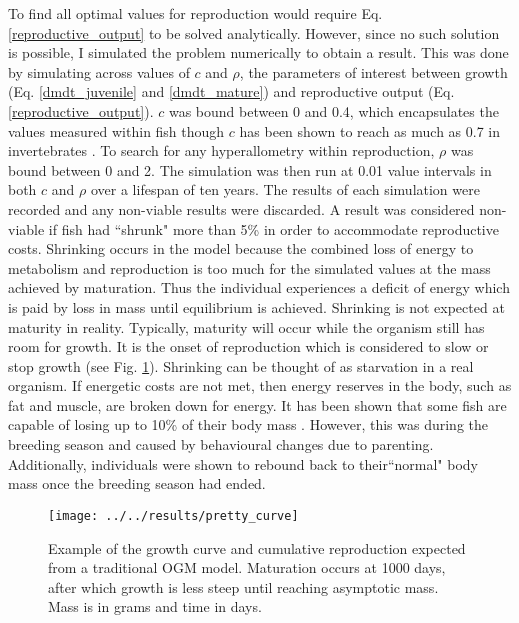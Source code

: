\documentclass[a4paper, 11pt, hidelinks]{article} %
\begin{document}
	To find all optimal values for reproduction would require Eq. \ref{reproductive_output} to be solved analytically.  However, since no such solution is possible, I simulated the problem numerically to obtain a result.  This was done by simulating across values of $ c $ and $ \rho $, the parameters of interest between growth (Eq. \ref{dmdt_juvenile} and \ref{dmdt_mature}) and reproductive output (Eq. \ref{reproductive_output}).  $ c $ was bound between 0 and 0.4, which encapsulates the values measured within fish \parencite{Roff1983, Wootton1985, Lambert2000, Fontoura2009, Benoit2018} though $ c $ has been shown to reach as much as 0.7 in invertebrates \parencite{Parker2018}.  To search for any hyperallometry within reproduction, $ \rho $ was bound between 0 and 2.  
	The simulation was then run at 0.01 value intervals in both $c$ and $\rho$ over a lifespan of ten years.  The results of each simulation were recorded and any non-viable results were discarded.  A result was considered non-viable if fish had ``shrunk" more than 5\% in order to accommodate reproductive costs.  Shrinking occurs in the model because  the combined loss of energy to metabolism and reproduction is too much for the simulated values at the mass achieved by maturation.  Thus the individual experiences a deficit of energy which is paid by loss in mass until equilibrium is achieved. %
	Shrinking is not expected at maturity in reality.  Typically, maturity will occur while the organism still has room for growth.  It is the onset of reproduction which is considered to slow or stop growth %
	(see Fig. \ref{OGM_Curve}).  Shrinking can be thought of as starvation in a real organism.  If energetic costs are not met, then energy reserves in the body, such as fat and muscle, are broken down for energy.  It has been shown that some fish are capable of losing up to 10\% of their body mass \parencite{VandenBerghe1992}.  However, this was during the breeding season and caused by behavioural changes due to parenting.  Additionally, individuals were shown to rebound back to their``normal" body mass once the breeding season had ended. %
	\begin{figure}[H]
		\centering 
		\texttt{[image: ../../results/pretty\_curve]}
		\caption{Example of the growth curve and cumulative reproduction expected from a traditional OGM model. Maturation occurs at 1000 days, after which growth is less steep until reaching asymptotic mass.  Mass is in grams and time in days.}
		\label{OGM_Curve}
	\end{figure}
	
\end{document}
